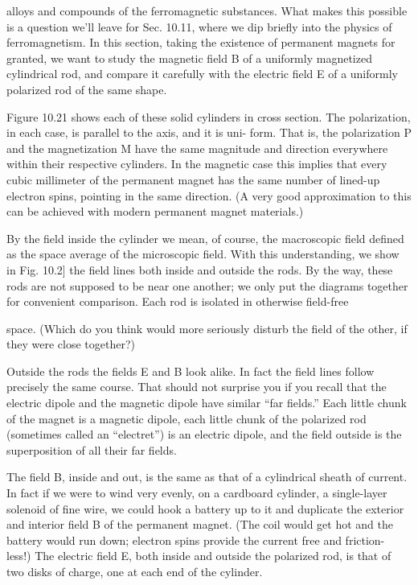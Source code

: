 {{{%
alloys and compounds of the ferromagnetic substances. What
makes this possible is a question we'll leave for Sec. 10.11, where we
dip briefly into the physics of ferromagnetism. In this section, taking
the existence of permanent magnets for granted, we want to study
the magnetic field B of a uniformly magnetized cylindrical rod, and
compare it carefully with the electric field E of a uniformly polarized
rod of the same shape.

Figure 10.21 shows each of these solid cylinders in cross section.
The polarization, in each case, is parallel to the axis, and it is uni-
form. That is, the polarization P and the magnetization M have the
same magnitude and direction everywhere within their respective
cylinders. In the magnetic case this implies that every cubic millimeter
of the permanent magnet has the same number of lined-up
electron spins, pointing in the same direction. (A very good approximation
to this can be achieved with modern permanent magnet
materials.)

By the field inside the cylinder we mean, of course, the macroscopic
field defined as the space average of the microscopic field.
With this understanding, we show in Fig. 10.2] the field lines both
inside and outside the rods. By the way, these rods are not supposed
to be near one another; we only put the diagrams together for convenient
comparison. Each rod is isolated in otherwise field-free

space. (Which do you think would more seriously disturb the field
of the other, if they were close together?)

Outside the rods the fields E and B look alike. In fact the field
lines follow precisely the same course. That should not surprise
you if you recall that the electric dipole and the magnetic dipole have
similar ``far fields.'' Each little chunk of the magnet is a magnetic
dipole, each little chunk of the polarized rod (sometimes called an
``electret'') is an electric dipole, and the field outside is the superposition
of all their far fields.

The field B, inside and out, is the same as that of a cylindrical
sheath of current. In fact if we were to wind very evenly, on a cardboard
cylinder, a single-layer solenoid of fine wire, we could hook
a battery up to it and duplicate the exterior and interior field B of
the permanent magnet. (The coil would get hot and the battery
would run down; electron spins provide the current free and friction-
less!) The electric field E, both inside and outside the polarized rod,
is that of two disks of charge, one at each end of the cylinder.

}}}
